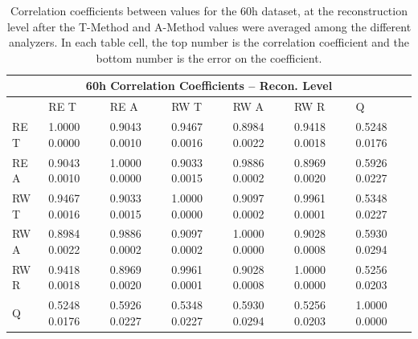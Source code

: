 \begin{table}
\setlength\tabcolsep{15pt}
\small
\centering
\renewcommand{\arraystretch}{1.4}
\begin{tabularx}{0.8\linewidth}{@{\extracolsep{\fill}}lXXXXXX}
  \toprule
  	\multicolumn{7}{c}{{\normalsize 60h Correlation Coefficients -- Recon. Level}} \\
  \midrule
  	       & RE T & RE A & RW T & RW A & RW R & \quad Q \\
  \midrule
	RE T   & 1.0000 0.0000 & 0.9043 0.0010 & 0.9467 0.0016 & 0.8984 0.0022 & 0.9418 0.0018 & 0.5248 0.0176  \\
	RE A   & 0.9043 0.0010 & 1.0000 0.0000 & 0.9033 0.0015 & 0.9886 0.0002 & 0.8969 0.0020 & 0.5926 0.0227  \\
	RW T   & 0.9467 0.0016 & 0.9033 0.0015 & 1.0000 0.0000 & 0.9097 0.0002 & 0.9961 0.0001 & 0.5348 0.0227  \\
	RW A   & 0.8984 0.0022 & 0.9886 0.0002 & 0.9097 0.0002 & 1.0000 0.0000 & 0.9028 0.0008 & 0.5930 0.0294  \\
	RW R   & 0.9418 0.0018 & 0.8969 0.0020 & 0.9961 0.0001 & 0.9028 0.0008 & 1.0000 0.0000 & 0.5256 0.0203  \\
	Q      & 0.5248 0.0176 & 0.5926 0.0227 & 0.5348 0.0227 & 0.5930 0.0294 & 0.5256 0.0203 & 1.0000 0.0000  \\
  \bottomrule
\end{tabularx}
\caption[]{Correlation coefficients between \R values for the 60h dataset, at the reconstruction level after the \RW T-Method and A-Method \R values were averaged among the different analyzers. In each table cell, the top number is the correlation coefficient and the bottom number is the error on the coefficient.}
\label{tab:Corrs_60h_recon}
\end{table}



